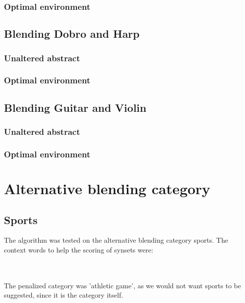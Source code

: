 \subsubsection{Optimal environment}

\subsection{Blending Dobro and Harp }
\subsubsection{Unaltered abstract}


\subsubsection{Optimal environment}


\subsection{Blending Guitar and Violin}
\subsubsection{Unaltered abstract}

\subsubsection{Optimal environment}



\section{Alternative blending category}
\subsection{Sports}
The algorithm was tested on the alternative blending category sports. The context words to help the scoring of synsets were:

\noindent{}
\\\\The penalized category was 'athletic game', as we would not want sports to be suggested, since it is the category itself.

